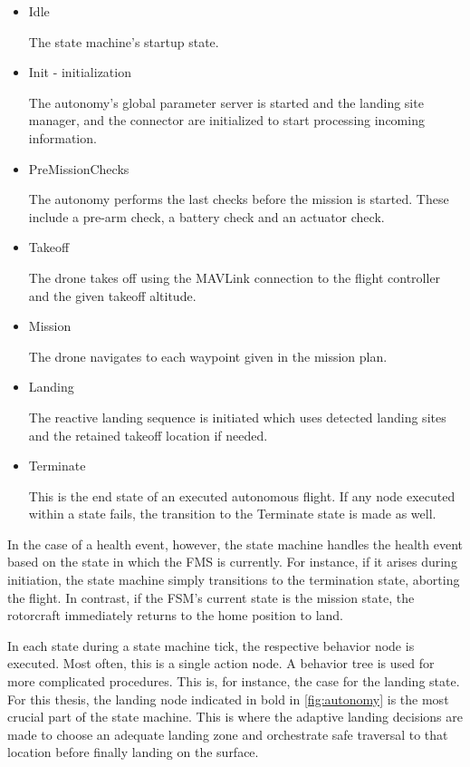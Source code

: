 \begin{itemize}
    \item Idle
    
    The state machine's startup state.
    \item Init - initialization
    
    The autonomy's global parameter server is started and the landing site manager, and the connector are initialized to start processing incoming information.
    \item PreMissionChecks
    
    The autonomy performs the last checks before the mission is started. These include a pre-arm check, a battery check and an actuator check.
    \item Takeoff
    
    The drone takes off using the MAVLink connection to the flight controller and the given takeoff altitude.
    \item Mission
    
    The drone navigates to each waypoint given in the mission plan.
    \item Landing 

    The reactive landing sequence is initiated which uses detected landing sites and the retained takeoff location if needed.
    \item Terminate 
    
    This is the end state of an executed autonomous flight. If any node executed within a state fails, the transition to the Terminate state is made as well.
\end{itemize}

In the case of a health event, however, the state machine handles the health event based on the state in which the FMS is currently. For instance, if it arises during initiation, the state machine simply transitions to the termination state, aborting the flight. In contrast, if the FSM's current state is the mission state, the rotorcraft immediately returns to the home position to land.

In each state during a state machine tick, the respective behavior node is executed. Most often, this is a single action node. A behavior tree is used for more complicated procedures. This is, for instance, the case for the landing state. For this thesis, the landing node indicated in bold in \cref{fig:autonomy} is the most crucial part of the state machine. This is where the adaptive landing decisions are made to choose an adequate landing zone and orchestrate safe traversal to that location before finally landing on the surface.

